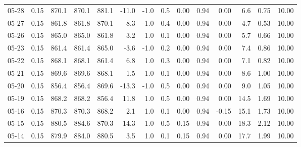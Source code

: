 \begin{threeparttable}
{\begin{tabular}{lrrrrrrrrrrrrr}
  05-28 &     0.15 & 870.1 & 870.1 & 881.1 &      -11.0 &                     -1.0 &                 0.5 &       0.00 &      0.94 &           0.00 &              6.6 &            0.75 &                  10.00 \\
  05-27 &     0.15 & 861.8 & 861.8 & 870.1 &       -8.3 &                     -1.0 &                 0.4 &       0.00 &      0.94 &           0.00 &              4.7 &            0.53 &                  10.00 \\
  05-26 &     0.15 & 865.0 & 865.0 & 861.8 &        3.2 &                      1.0 &                 0.1 &       0.00 &      0.94 &           0.00 &              5.7 &            0.66 &                  10.00 \\
  05-23 &     0.15 & 861.4 & 861.4 & 865.0 &       -3.6 &                     -1.0 &                 0.2 &       0.00 &      0.94 &           0.00 &              7.4 &            0.86 &                  10.00 \\
  05-22 &     0.15 & 868.1 & 868.1 & 861.4 &        6.8 &                      1.0 &                 0.3 &       0.00 &      0.94 &           0.00 &              7.1 &            0.82 &                  10.00 \\
  05-21 &     0.15 & 869.6 & 869.6 & 868.1 &        1.5 &                      1.0 &                 0.1 &       0.00 &      0.94 &           0.00 &              8.6 &            1.00 &                  10.00 \\
  05-20 &     0.15 & 856.4 & 856.4 & 869.6 &      -13.3 &                     -1.0 &                 0.5 &       0.00 &      0.94 &           0.00 &              9.0 &            1.05 &                  10.00 \\
  05-19 &     0.15 & 868.2 & 868.2 & 856.4 &       11.8 &                      1.0 &                 0.5 &       0.00 &      0.94 &           0.00 &             14.5 &            1.69 &                  10.00 \\
  05-16 &     0.15 & 870.3 & 870.3 & 868.2 &        2.1 &                      1.0 &                 0.1 &       0.00 &      0.94 &          -0.15 &             15.1 &            1.73 &                  10.00 \\
  05-15 &     0.15 & 880.5 & 884.6 & 870.3 &       14.3 &                      1.0 &                 0.5 &       0.15 &      0.94 &           0.00 &             18.3 &            2.12 &                  10.00 \\
  05-14 &     0.15 & 879.9 & 884.0 & 880.5 &        3.5 &                      1.0 &                 0.1 &       0.15 &      0.94 &           0.00 &             17.7 &            1.99 &                  10.00 \\

\end{tabular}}
\end{threeparttable}
